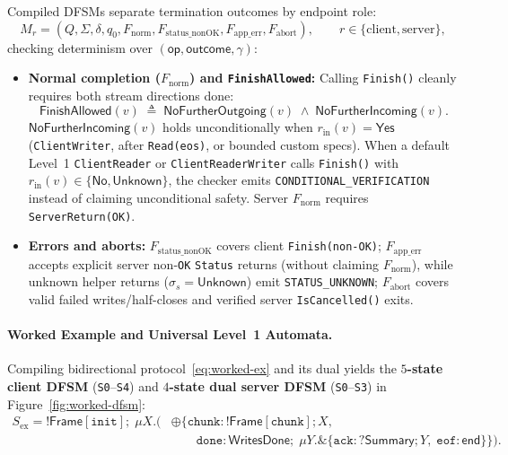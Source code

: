 Compiled DFSMs separate termination outcomes by endpoint role:
\begin{equation}
\label{eq:dfsm-tuple}
M_r = (Q, \Sigma, \delta, q_0, F_{\mathrm{norm}}, F_{\mathrm{status\_nonOK}}, F_{\mathrm{app\_err}}, F_{\mathrm{abort}}), \qquad r \in \{\mathrm{client}, \mathrm{server}\},
\end{equation}
checking determinism over $(\mathsf{op}, \mathsf{outcome}, \gamma)$:
\begin{itemize}
    \item \textbf{Normal completion ($F_{\mathrm{norm}}$) and \texttt{FinishAllowed}:} Calling \texttt{Finish()} cleanly requires both stream directions done:
    \begin{equation}
    \label{eq:finish-allowed}
    \mathsf{FinishAllowed}(v) \;\triangleq\; \mathsf{NoFurtherOutgoing}(v) \;\land\; \mathsf{NoFurtherIncoming}(v).
    \end{equation}
    $\mathsf{NoFurtherIncoming}(v)$ holds unconditionally when $r_{\mathrm{in}}(v) = \mathsf{Yes}$ (\texttt{ClientWriter}, after \texttt{Read(eos)}, or bounded custom specs). When a default Level~1 \texttt{ClientReader} or \texttt{ClientReaderWriter} calls \texttt{Finish()} with $r_{\mathrm{in}}(v) \in \{\mathsf{No}, \mathsf{Unknown}\}$, the checker emits \texttt{CONDITIONAL\_\allowbreak VERIFICATION} instead of claiming unconditional safety. Server $F_{\mathrm{norm}}$ requires \texttt{ServerReturn(OK)}.
    \item \textbf{Errors and aborts:} $F_{\mathrm{status\_nonOK}}$ covers client \texttt{Finish(non-OK)}; $F_{\mathrm{app\_err}}$ accepts explicit server non-\texttt{OK} \texttt{Status} returns (without claiming $F_{\mathrm{norm}}$), while unknown helper returns ($\sigma_s = \mathsf{Unknown}$) emit \texttt{STATUS\_\allowbreak UNKNOWN}; $F_{\mathrm{abort}}$ covers valid failed writes/half-closes and verified server \texttt{IsCancelled()} exits.
\end{itemize}

\paragraph{Worked Example and Universal Level~1 Automata.}
Compiling bidirectional protocol~\eqref{eq:worked-ex} and its dual yields the \textbf{$5$-state client DFSM} (\texttt{S0}--\texttt{S4}) and \textbf{$4$-state dual server DFSM} (\texttt{S0}--\texttt{S3}) in Figure~\ref{fig:worked-dfsm}:
\begin{equation}
\label{eq:worked-ex}
\begin{aligned}
S_{\mathrm{ex}} = {!}\mathsf{Frame}[\mathtt{init}];\; \mu X.\bigl(&\oplus\{\mathtt{chunk}: {!}\mathsf{Frame}[\mathtt{chunk}]; X, \\
&\qquad \mathtt{done}: \mathsf{WritesDone};\; \mu Y.\&\{\mathtt{ack}: {?}\mathsf{Summary}; Y,\; \mathtt{eof}: \mathsf{end}\}\}\bigr).
\end{aligned}
\end{equation}

